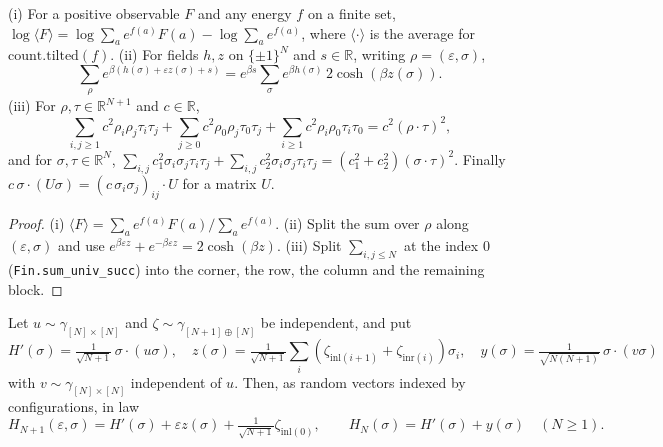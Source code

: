 \begin{lemma}\label{lem:sg:cavity-algebra}
  \leanok
(i) For a positive observable $F$ and any energy $f$ on a finite set, $\log\langle F\rangle=\log\sum_ae^{f(a)}F(a)-\log\sum_ae^{f(a)}$, where
$\langle\cdot\rangle$ is the average for $\mathrm{count.tilted}(f)$. (ii) For fields $h,z$ on $\{\pm1\}^N$ and $s\in\mathbb R$, writing $\rho=(\varepsilon,\sigma)$,
\[\sum_{\rho}e^{\beta(h(\sigma)+\varepsilon z(\sigma)+s)}=e^{\beta s}\sum_\sigma e^{\beta h(\sigma)}\,2\cosh(\beta z(\sigma)).\]
(iii) For $\rho,\tau\in\mathbb R^{N+1}$ and $c\in\mathbb R$,
\[\sum_{i,j\ge1}c^2\rho_i\rho_j\tau_i\tau_j+\sum_{j\ge0}c^2\rho_0\rho_j\tau_0\tau_j+\sum_{i\ge1}c^2\rho_i\rho_0\tau_i\tau_0=c^2(\rho\cdot\tau)^2,\]
and for $\sigma,\tau\in\mathbb R^N$, $\sum_{i,j}c_1^2\sigma_i\sigma_j\tau_i\tau_j+\sum_{i,j}c_2^2\sigma_i\sigma_j\tau_i\tau_j=(c_1^2+c_2^2)(\sigma\cdot\tau)^2$.
Finally $c\,\sigma\cdot(U\sigma)=(c\,\sigma_i\sigma_j)_{ij}\cdot U$ for a matrix $U$.
\end{lemma}

\begin{proof}
  \leanok
(i) $\langle F\rangle=\sum_ae^{f(a)}F(a)/\sum_ae^{f(a)}$. (ii) Split the sum over $\rho$ along $(\varepsilon,\sigma)$ and use
$e^{\beta\varepsilon z}+e^{-\beta\varepsilon z}=2\cosh(\beta z)$. (iii) Split $\sum_{i,j\le N}$ at the index $0$ (\texttt{Fin.sum\_univ\_succ}) into
the corner, the row, the column and the remaining block.
\end{proof}

\begin{theorem}\label{thm:sg:cavity}
  \leanok
Let $u\sim\gamma_{[N]\times[N]}$ and $\zeta\sim\gamma_{[N+1]\oplus[N]}$ be independent, and put
\[H'(\sigma)=\tfrac1{\sqrt{N+1}}\,\sigma\!\cdot\!(u\sigma),\quad z(\sigma)=\tfrac1{\sqrt{N+1}}\sum_{i}(\zeta_{\mathrm{inl}(i+1)}+\zeta_{\mathrm{inr}(i)})\sigma_i,\quad
y(\sigma)=\tfrac1{\sqrt{N(N+1)}}\,\sigma\!\cdot\!(v\sigma)\]
with $v\sim\gamma_{[N]\times[N]}$ independent of $u$. Then, as random vectors indexed by configurations, in law
\[H_{N+1}(\varepsilon,\sigma)=H'(\sigma)+\varepsilon z(\sigma)+\tfrac1{\sqrt{N+1}}\zeta_{\mathrm{inl}(0)},\qquad H_N(\sigma)=H'(\sigma)+y(\sigma)\quad(N\ge1).\]
\end{theorem}

